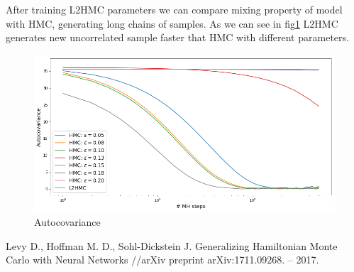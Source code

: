 \documentclass{article}
\begin{document}
After training L2HMC parameters we can compare mixing property of model with HMC, generating long chains of samples. As we can see in fig\ref{fig:aut} L2HMC generates new uncorrelated sample faster that HMC with different parameters.
\begin{figure}[H]
    \centering
 \includegraphics[width=0.8\linewidth]{autocovariance.png}
    \caption{Autocovariance}
    \label{fig:aut}
\end{figure}

\begin{thebibliography}{}
\bibitem{}
Levy D., Hoffman M. D., Sohl-Dickstein J. Generalizing Hamiltonian Monte Carlo with Neural Networks //arXiv preprint arXiv:1711.09268. – 2017.
\end{thebibliography}
\end{document}
